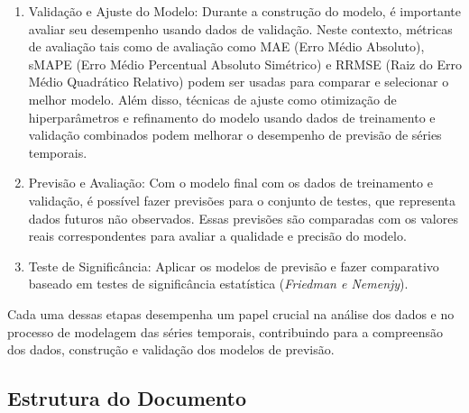 \begin{enumerate}
\item {Validação e Ajuste do Modelo}: Durante a construção do modelo, é importante avaliar seu desempenho usando dados de validação. Neste contexto, métricas de avaliação tais como de avaliação como MAE (Erro Médio Absoluto), sMAPE (Erro Médio Percentual Absoluto Simétrico) e RRMSE (Raiz do Erro Médio Quadrático Relativo) podem ser usadas para comparar e selecionar o melhor modelo. Além disso, técnicas de ajuste como otimização de hiperparâmetros e refinamento do modelo usando dados de treinamento e validação combinados podem melhorar o desempenho de previsão de séries temporais.
	
\item {Previsão e Avaliação}: Com o modelo final com os dados de treinamento e validação, é possível fazer previsões para o conjunto de testes, que representa dados futuros não observados. Essas previsões são comparadas com os valores reais correspondentes para avaliar a qualidade e precisão do modelo.
	
\item {Teste de Significância}: Aplicar os modelos de previsão e fazer comparativo baseado em testes de significância estatística (\textit{Friedman e Nemenjy}).
	
	
\end{enumerate}

Cada uma dessas etapas desempenha um papel crucial na análise dos dados e no processo de modelagem das séries temporais, contribuindo para a compreensão dos dados, construção e validação dos modelos de previsão.

\subsection{Estrutura do Documento} \label{subsec:estrutura}


